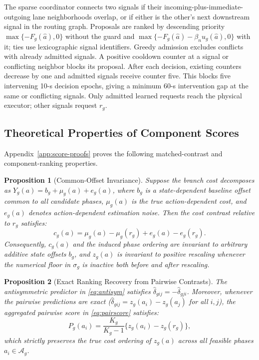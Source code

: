 \documentclass[letterpaper,journal]{IEEEtran}
\newtheorem{proposition}{Proposition}
\begin{document}
The sparse coordinator connects two signals if their incoming-plus-immediate-outgoing lane neighborhoods overlap, or if either is the other's next downstream signal in the routing graph. Proposals are ranked by descending priority $\max\{-F_g(\widehat a),0\}$ without the guard and $\max\{-F_g(\widehat a)-\beta_nu_g(\widehat a),0\}$ with it; ties use lexicographic signal identifiers. Greedy admission excludes conflicts with already admitted signals. A positive cooldown counter at a signal or conflicting neighbor blocks its proposal. After each decision, existing counters decrease by one and admitted signals receive counter five. This blocks five intervening 10-s decision epochs, giving a minimum 60-s intervention gap at the same or conflicting signals. Only admitted learned requests reach the physical executor; other signals request $r_g$.

\subsection{Theoretical Properties of Component Scores}
Appendix~\ref{app:score-proofs} proves the following matched-contrast and component-ranking properties.

\begin{proposition}[Common-Offset Invariance]
\label{prop:offset}
Suppose the branch cost decomposes as $Y_g(a)=b_g+\mu_g(a)+e_g(a)$, where $b_g$ is a state-dependent baseline offset common to all candidate phases, $\mu_g(a)$ is the true action-dependent cost, and $e_g(a)$ denotes action-dependent estimation noise. Then the cost contrast relative to $r_g$ satisfies:
\begin{equation}
 c_g(a)=\mu_g(a)-\mu_g(r_g)+e_g(a)-e_g(r_g).
 \label{eq:cancellation}
\end{equation}
Consequently, $c_g(a)$ and the induced phase ordering are invariant to arbitrary additive state offsets $b_g$, and $z_g(a)$ is invariant to positive rescaling whenever the numerical floor in $\sigma_g$ is inactive both before and after rescaling.
\end{proposition}

\begin{proposition}[Exact Ranking Recovery from Pairwise Contrasts]
\label{prop:pair-recovery}
The antisymmetric predictor in \eqref{eq:antisym} satisfies $\widehat\delta_{gij} = -\widehat\delta_{gji}$. Moreover, whenever the pairwise predictions are exact ($\widehat\delta_{gij} = z_g(a_i) - z_g(a_j)$ for all $i,j$), the aggregated pairwise score in \eqref{eq:pairscore} satisfies:
\begin{equation}
 P_g(a_i)=\frac{K_g}{K_g-1}\{z_g(a_i)-z_g(r_g)\},
 \label{eq:recovery}
\end{equation}
which strictly preserves the true cost ordering of $z_g(a)$ across all feasible phases $a_i \in \mathcal A_g$.
\end{proposition}
\end{document}
